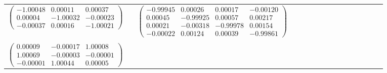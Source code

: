 \begin{table}
\begin{tabular*}{\textwidth}{@{}l*{15}{@{}l}}
   \\
  $\left(\begin{array}{ccc}
    -1.00048 &  0.00011 &  0.00037 \\
     0.00004 & -1.00032 & -0.00023 \\
    -0.00037 &  0.00016 & -1.00021
  \end{array}\right)$&&$\left(\begin{array}{cccc}
    -0.99945 &  0.00026 &  0.00017 & -0.00120 \\
     0.00045 & -0.99925 &  0.00057 &  0.00217 \\
     0.00021 & -0.00318 & -0.99978 &  0.00154 \\
    -0.00022 &  0.00124 &  0.00039 & -0.99861
   \end{array}\right)$\\
  
  \\
  $\left(\begin{array}{ccc}
    0.00009 & -0.00017 &  1.00008 \\
    1.00069 & -0.00003 & -0.00001 \\
   -0.00001 &  1.00044 &  0.00005
  \end{array}\right)$&&\\


\end{tabular*}
\end{table}
